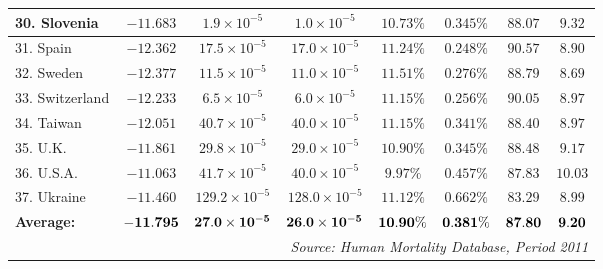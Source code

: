 \documentclass[12pt, titlepage]{article}%
\begin{document}
\begin{table}
\begin{center}
\begin{tabular}{||l|c|c|c|c|c|c|c||}
30. Slovenia &  $-11.683$ & $1.9\times10^{-5}$ & $1.0\times10^{-5}$ & $10.73\%$ & $0.345\%$ & $88.07$ & $9.32$\\ \hline
31. Spain &  $-12.362$ & $17.5\times10^{-5}$ & $17.0\times10^{-5}$ & $11.24\%$ & $0.248\%$ & $90.57$ & $8.90$\\ \hline
32. Sweden &  $-12.377$ & $11.5\times10^{-5}$ & $11.0\times10^{-5}$ & $11.51\%$ & $0.276\%$ & $88.79$ & $8.69$\\ \hline
33. Switzerland &  $-12.233$ & $6.5\times10^{-5}$ & $6.0\times10^{-5}$ & $11.15\%$ & $0.256\%$ & $90.05$ & $8.97$\\ \hline
34. Taiwan &  $-12.051$ & $40.7\times10^{-5}$ & $40.0\times10^{-5}$ & $11.15\%$ & $0.341\%$ & $88.40$ & $8.97$\\ \hline
35. U.K. &  $-11.861$ & $29.8\times10^{-5}$ & $29.0\times10^{-5}$ & $10.90\%$ & $0.345\%$ & $88.48$ & $9.17$\\ \hline
36. U.S.A. &  $-11.063$ & $41.7\times10^{-5}$ & $40.0\times10^{-5}$ & $9.97\%$ & $0.457\%$ & $87.83$ & $10.03$\\ \hline
37. Ukraine &  $-11.460$ & $129.2\times10^{-5}$ & $128.0\times10^{-5}$ & $11.12\%$ & $0.662\%$ & $83.29$ & $8.99$\\ \hline
{\bf Average:} & $\bf -11.795$ & $\bf 27.0\times10^{-5}$ & $\bf 26.0\times10^{-5}$ & $\bf 10.90\%$ & $\bf 0.381\%$ & $\bf 87.80$ & $\bf 9.20$\\ \hline
\hline
\multicolumn{8}{||r||}{{\em Source: Human Mortality Database, Period 2011}} \\ \hline\hline
\end{tabular}
\label{lab2}
\smallskip
\end{center}
\end{table}
\end{document}
